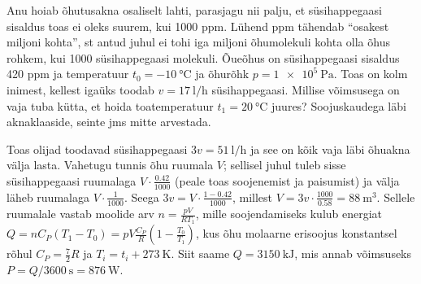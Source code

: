 
Anu hoiab õhutusakna osaliselt lahti, parasjagu nii palju, et süsihappegaasi sisaldus toas ei oleks suurem, kui 1000 ppm. Lühend ppm tähendab ``osakest miljoni kohta'', st antud juhul ei tohi iga miljoni õhumolekuli kohta olla õhus rohkem, kui 1000 süsihappegaasi molekuli. Õueõhus on süsihappegaasi sisaldus 420 ppm ja temperatuur  $t_0=\SI{-10}{\celsius}$ ja õhurõhk $p=\SI{1e5}{\pascal}$. Toas on kolm inimest, kellest igaüks toodab $v=\SI{17}{\litre\per\hour}$  süsihappegaasi. Millise võimsusega on vaja tuba kütta, et hoida toatemperatuur $t_1=\SI{20}{\celsius}$ juures? Soojuskaudega läbi aknaklaaside, seinte jms mitte arvestada.




\hint

\solu
Toas olijad toodavad süsihappegaasi $3v=\SI{51}{\litre\per\hour}$ ja see on kõik vaja läbi õhuakna välja lasta. Vahetugu tunnis õhu ruumala $V$; sellisel juhul tuleb sisse süsihappegaasi ruumalaga $V\cdot \frac{0.42}{1000}$ (peale toas soojenemist ja paisumist) ja välja läheb ruumalaga $V\cdot \frac{1}{1000}$. Seega $3v=V\cdot \frac{1-0.42}{1000}$, millest $V=3v\cdot \frac{1000}{0.58}=\SI{88}{\m\cubed}$. Sellele ruumalale vastab moolide arv $n=\frac{pV}{RT_1}$, mille soojendamiseks kulub energiat $Q=nC_P(T_1-T_0)=pV \frac{C_P}R(1-\frac{T_0}{T_1})$, kus õhu molaarne  erisoojus konstantsel rõhul $C_P=\frac 72R$ ja $T_i=t_i+\SI{273}{\kelvin}$.
Siit saame $Q=\SI{3150}{\kilo\J}$, mis annab võimsuseks $P=Q/\SI{3600}{\s}=\SI{876}\watt$.
\probend